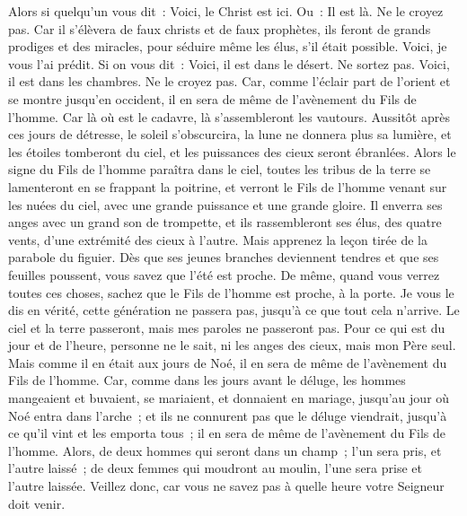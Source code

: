\begin{multicols}{2}
Alors si quelqu'un vous dit~: Voici, le Christ est ici. Ou~: Il est là. Ne le croyez pas.
Car il s'élèvera de faux christs et de faux prophètes, ils feront de grands prodiges et des miracles, pour séduire même les élus, s'il était possible.
Voici, je vous l'ai prédit.
Si on vous dit~: Voici, il est dans le désert. Ne sortez pas. Voici, il est dans les chambres. Ne le croyez pas.
Car, comme l'éclair part de l'orient et se montre jusqu'en occident, il en sera de même de l'avènement du Fils de l'homme.
Car là où est le cadavre, là s'assembleront les vautours.
Aussitôt après ces jours de détresse, le soleil s'obscurcira, la lune ne donnera plus sa lumière, et les étoiles tomberont du ciel, et les puissances des cieux seront ébranlées.
Alors le signe du Fils de l'homme paraîtra dans le ciel, toutes les tribus de la terre se lamenteront en se frappant la poitrine, et verront le Fils de l'homme venant sur les nuées du ciel, avec une grande puissance et une grande gloire.
Il enverra ses anges avec un grand son de trompette, et ils rassembleront ses élus, des quatre vents, d'une extrémité des cieux à l'autre.
Mais apprenez la leçon tirée de la parabole du figuier. Dès que ses jeunes branches deviennent tendres et que ses feuilles poussent, vous savez que l'été est proche.
De même, quand vous verrez toutes ces choses, sachez que le Fils de l'homme est proche, à la porte.
Je vous le dis en vérité, cette génération ne passera pas, jusqu'à ce que tout cela n'arrive.
Le ciel et la terre passeront, mais mes paroles ne passeront pas.
Pour ce qui est du jour et de l'heure, personne ne le sait, ni les anges des cieux, mais mon Père seul.
Mais comme il en était aux jours de Noé, il en sera de même de l'avènement du Fils de l'homme.
Car, comme dans les jours avant le déluge, les hommes mangeaient et buvaient, se mariaient, et donnaient en mariage, jusqu'au jour où Noé entra dans l'arche~;
et ils ne connurent pas que le déluge viendrait, jusqu'à ce qu'il vint et les emporta tous~; il en sera de même de l'avènement du Fils de l'homme.
Alors, de deux hommes qui seront dans un champ~; l'un sera pris, et l'autre laissé~;
de deux femmes qui moudront au moulin, l'une sera prise et l'autre laissée.
Veillez donc, car vous ne savez pas à quelle heure votre Seigneur doit venir.

\end{multicols}
